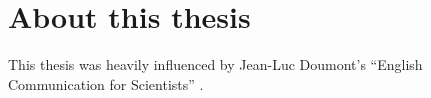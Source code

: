 \chapter{About this thesis}

This thesis was heavily influenced by Jean-Luc Doumont's \enquote{English Communication for Scientists} .